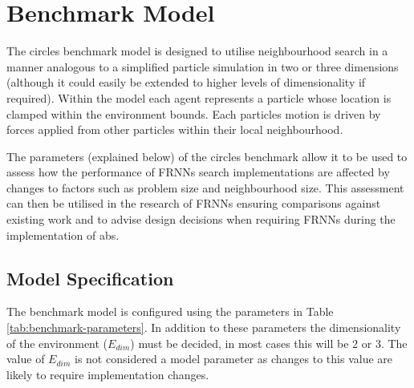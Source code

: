 \section{Benchmark Model\label{sec:benchmark-model}}
  The circles benchmark model is designed to utilise neighbourhood search in a manner analogous to a simplified particle simulation in two or three dimensions (although it could easily be extended to higher levels of dimensionality if required). Within the model each agent represents a particle whose location is clamped within the environment bounds. Each particles motion is driven by forces applied from other particles within their local neighbourhood.
   
  The parameters (explained below) of the circles benchmark allow it to be used to assess how the performance of FRNNs search implementations are affected by changes to factors such as problem size and neighbourhood size. This assessment can then be utilised in the research of FRNNs ensuring comparisons against existing work and to advise design decisions when requiring FRNNs during the implementation of \gls{abs}.
  
  \subsection{Model Specification}  
    The benchmark model is configured using the parameters in Table \ref{tab:benchmark-parameters}. In addition to these parameters the dimensionality of the environment ($E_{dim}$) must be decided, in most cases this will be 2 or 3. The value of $E_{dim}$ is not considered a model parameter as changes to this value are likely to require implementation changes.

